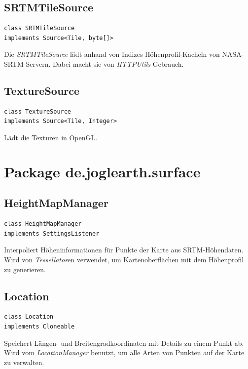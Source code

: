 \documentclass[10pt]{scrreprt}
\begin{document}
\subsection*{SRTMTileSource}
\begin{lstlisting}
class SRTMTileSource
implements Source<Tile, byte[]>
\end{lstlisting}
Die \textit{SRTMTileSource} lädt anhand von Indizes Höhenprofil-Kacheln von NASA-SRTM-Servern. Dabei macht sie von \textit{HTTPUtils} Gebrauch.\\

\newpage
\vspace{5mm}
\subsection*{TextureSource}
\begin{lstlisting}
class TextureSource
implements Source<Tile, Integer>
\end{lstlisting}
Lädt die Texturen in OpenGL.\\



\vspace{5mm}
\section{Package de.joglearth.surface}
\subsection*{HeightMapManager}
\begin{lstlisting}
class HeightMapManager
implements SettingsListener
\end{lstlisting}
Interpoliert Höheninformationen für Punkte der Karte aus SRTM-Höhendaten. Wird von \textit{Tessellator}en verwendet, um Kartenoberflächen mit dem Höhenprofil zu generieren.\\

\vspace{5mm}
\subsection*{Location}
\begin{lstlisting}
class Location
implements Cloneable
\end{lstlisting}
Speichert Längen- und Breitengradkoordinaten mit Details zu einem Punkt ab. Wird vom \textit{LocationManager} benutzt, um alle Arten von Punkten auf der Karte zu verwalten.\\
\end{document}
